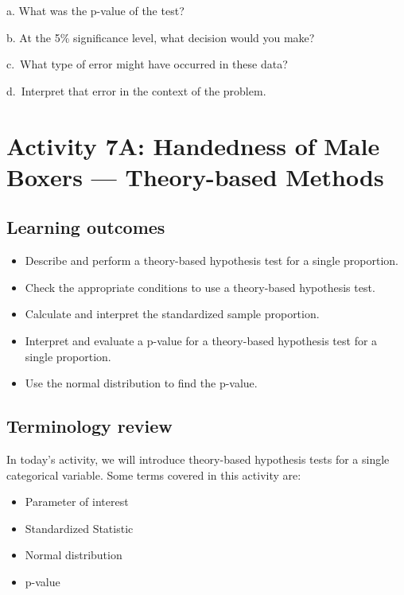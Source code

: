 \documentclass[
]{report}
\newcommand{\rgs}{\vspace{12pt}} %
\newcommand{\rgi}{\hspace{24pt}}  %
\begin{document}
\rgi a. What was the p-value of the test?
\rgs

\rgi b. At the 5\% significance level, what decision would you make?
\rgs

\rgi c.~What type of error might have occurred in these data?
\rgs

\rgi d.~Interpret that error in the context of the problem.
\rgs

\newpage

\hypertarget{activity-7a-handedness-of-male-boxers-theory-based-methods}{%
\section{Activity 7A: Handedness of Male Boxers --- Theory-based Methods}\label{activity-7a-handedness-of-male-boxers-theory-based-methods}}


\hypertarget{learning-outcomes-12}{%
\subsection{Learning outcomes}\label{learning-outcomes-12}}

\begin{itemize}
\item
  Describe and perform a theory-based hypothesis test for a single proportion.
\item
  Check the appropriate conditions to use a theory-based hypothesis test.
\item
  Calculate and interpret the standardized sample proportion.
\item
  Interpret and evaluate a p-value for a theory-based hypothesis test for a single proportion.
\item
  Use the normal distribution to find the p-value.
\end{itemize}

\hypertarget{terminology-review-10}{%
\subsection{Terminology review}\label{terminology-review-10}}

In today's activity, we will introduce theory-based hypothesis tests for a single categorical variable. Some terms covered in this activity are:

\begin{itemize}
\item
  Parameter of interest
\item
  Standardized Statistic
\item
  Normal distribution
\item
  p-value
\end{itemize}
\end{document}
